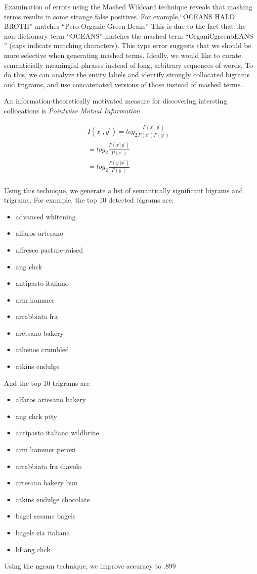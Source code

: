 \documentclass[11pt,a4paper]{article}
\newenvironment{myitemize}
{ \begin{itemize}
    \setlength{\itemsep}{0pt}
    \setlength{\parskip}{0pt}
    \setlength{\parsep}{0pt}     }
{ \end{itemize}                  }
\begin{document}
Examination of errors using the Mashed Wildcard technique reveals that
mashing terms results in some strange false positives.
For example,``OCEANS HALO BROTH'' matches ``Pero Organic Green Beans''
This is due to the fact that the non-dictionary term ``OCEANS''
matches the mashed term ``OrganiCgreenbEANS '' (caps indicate matching
characters).  This type error suggests that we should be more
selective when generating mashed terms.  Ideally, we would like to
curate semanticially meaningful phrases instead of long, arbitrary
sequences of words.  To do this, we can analyze the entity labels and
identify strongly collocated bigrams and trigrams, and use
concatenated versions of those instead of mashed terms.

An information-theoretically motivated measure for discovering
intersting collocations is {\em Pointwise Mutual Information}~\cite{manning:1999}

\begin{equation}
\begin{split}
  \label{eq:pmi}
  I(x^\prime,y^\prime) = log_2\frac{P(x^\prime,y^\prime)}{ P(x^\prime)P(y^\prime) } \\
  = log_2\frac{P(x^\prime|y^\prime)}{ P(x^\prime) } \\
  = log_2\frac{P(y^\prime|x^\prime)}{ P(y^\prime) } \\
\end{split}
\end{equation}

Using this technique, we generate a list of semantically significant
bigrams and trigrams.  For example, the top 10 detected bigrams are:
\begin{myitemize}
\item advanced whitening
\item alfaros artesano
\item alfresco pasture-raised
\item ang chck
\item antipasto italiano
\item arm hammer
\item arrabbiata fra
\item aretsano bakery
\item athenos crumbled
\item atkins endulge
\end{myitemize}
And the top 10 trigrams are
\begin{myitemize}
\item alfaros artesano bakery
\item ang chck ptty
\item antipasto italiano wildbrine
\item arm hammer peroxi
\item arrabbiata fra diavolo
\item artesano bakery bun
\item atkins endulge chocolate
\item bagel sesame bagels
\item bagels zia italiana
\item bf ang chck
\end{myitemize}
Using the ngram technique, we improve accuracy to .899
\end{document}
